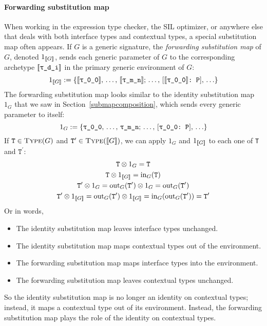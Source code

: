 \documentclass[../generics]{subfiles}
\begin{document}
\paragraph{Forwarding substitution map} When working in the expression type checker, the SIL optimizer, or anywhere else that deals with both interface types and contextual types, a special substitution map often appears. If $G$ is a generic signature, the \emph{forwarding substitution map} of $G$, denoted $1_{[\![G]\!]}$, sends each generic parameter  of $G$ to the corresponding archetype $[\![\texttt{\texttt{$\uptau$\_d\_i}}]\!]$ in the primary generic environment of $G$:
\[1_{\EquivClass{G}}:=\{\archetype{\ttgp{0}{0}},\,\ldots,\,\archetype{\ttgp{m}{n}};\,\ldots,\,\ConfReq{$\archetype{\ttgp{0}{0}}$}{P},\,\ldots\}\]
The forwarding substitution map looks similar to the identity substitution map $1_G$ that we saw in Section~\ref{submapcomposition}, which sends every generic parameter to itself:
\[1_{G}:=\{\texttt{$\uptau$\_0\_0},\,\ldots,\,\texttt{$\uptau$\_m\_n};\,\ldots,\,[\texttt{\texttt{$\uptau$\_0\_0}:~P}],\,\ldots\}\]
If $\texttt{T}\in\textsc{Type}({G})$ and $\texttt{T}^\prime\in\textsc{Type}({[\![G]\!]})$, we can apply $1_G$ and $1_{[\![G]\!]}$ to each one of \texttt{T} and $\texttt{T}^\prime$:
\begin{gather*}
\texttt{T}\otimes 1_G=\texttt{T}\\
\texttt{T}\otimes 1_{[\![G]\!]}=\mathrm{in}_G(\texttt{T})\\
\texttt{T}^\prime\otimes 1_G=\mathrm{out}_G(\texttt{T}^\prime)\otimes 1_G=\mathrm{out}_G(\texttt{T}^\prime)\\
\texttt{T}^\prime\otimes 1_{[\![G]\!]}=\mathrm{out}_G(\texttt{T}^\prime)\otimes 1_{[\![G]\!]}=\mathrm{in}_G(\mathrm{out}_G(\texttt{T}^\prime))=\texttt{T}^\prime
\end{gather*}
Or in words,
\begin{itemize}
\item The identity substitution map leaves interface types unchanged.
\item The identity substitution map maps contextual types out of the environment.
\item The forwarding substitution map maps interface types into the environment.
\item The forwarding substitution map leaves contextual types unchanged.
\end{itemize}
So the identity substitution map is no longer an identity on contextual types; instead, it maps a contextual type out of its environment. Instead, the forwarding substitution map plays the role of the identity on contextual types.
\end{document}
